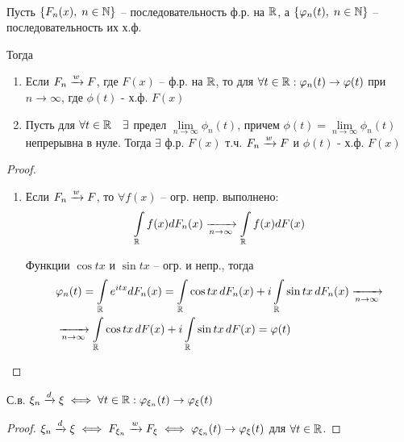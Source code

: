 \begin{theorem}[непрерывности]~

  Пусть $\{ F_n(x),\; n \in \mathbb{N} \}$ -- последовательность ф.р. на $\mathbb{R}$, 
  а $\{ \varphi_n(t),\; n \in \mathbb{N} \}$ -- последовательность их х.ф.

  Тогда
  \begin{enumerate}
    \item
      Если $F_n \xrightarrow{w} F$, где $F(x)$ -- ф.р. на $\mathbb{R}$, 
      то для $\forall t \in \mathbb{R}: \varphi_n(t) \to \varphi(t)$ при $n \to \infty$, 
      где $\phi(t)$ - х.ф. $F(x)$

    \item
      Пусть для $\forall t \in \mathbb{R} \quad \exists$ предел $\lim\limits_{n \to \infty} \phi_n (t)$,
      причем $\phi(t) = \lim\limits_{n \to \infty} \phi_n(t)$ непрерывна в нуле. 
      Тогда $\exists$ ф.р. $F(x)$ т.ч. $F_n \xrightarrow{w} F$ и $\phi(t)$ - х.ф. $F(x)$
  \end{enumerate}

  \begin{proof}
    \begin{enumerate}
      \item
        Если $F_n \xrightarrow{w} F$, то $\forall f(x)$ -- огр. непр. выполнено:
        \begin{align*}
          \int\limits_{\mathbb{R}} f(x) dF_n(x) \xrightarrow[n \to \infty]{} \int\limits_{\mathbb{R}} f(x) dF(x)
        \end{align*}

        Функции $\cos{tx}$ и $\sin{tx}$ -- огр. и непр., тогда 
        \begin{align*}
          &\varphi_n (t) = \int\limits_{\mathbb{R}} e^{i t x} dF_n(x) 
          = \int\limits_{\mathbb{R}} \cos{tx}\, dF_n(x) + i \int\limits_{\mathbb{R}} \sin{tx}\, dF_n(x)
          \xrightarrow[n \to \infty]{}\\
          &\xrightarrow[n \to \infty]{} \int\limits_{\mathbb{R}} \cos{tx}\, dF(x) 
          + i \int\limits_{\mathbb{R}} \sin{tx}\, dF(x) = \varphi(t)
        \end{align*}
    \end{enumerate}
  \end{proof}
\end{theorem}

\begin{corollary}
  С.в. $\xi_n \xrightarrow{d} \xi \iff \forall t \in \mathbb{R}:
  \varphi_{\xi_n} (t) \to \varphi_\xi (t)$

  \begin{proof}
    $\xi_n \xrightarrow{d} \xi \iff F_{\xi_n} \xrightarrow{w} F_{\xi} \iff 
    \varphi_{\xi_n} (t) \to \varphi_\xi (t)$ для $\forall t \in \mathbb{R}$.
  \end{proof}
\end{corollary}

